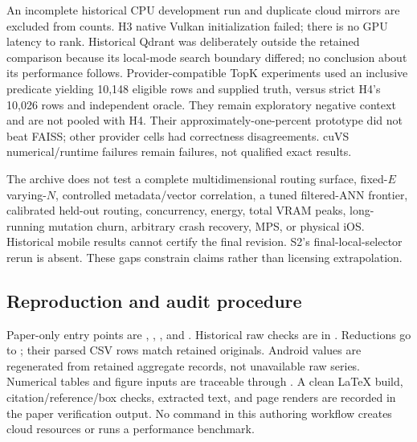 An incomplete historical CPU development run and duplicate cloud mirrors are excluded from counts. H3 native Vulkan initialization failed; there is no GPU latency to rank. Historical Qdrant was deliberately outside the retained comparison because its local-mode search boundary differed; no conclusion about its performance follows. Provider-compatible TopK experiments used an inclusive predicate yielding 10,148 eligible rows and supplied truth, versus strict H4's 10,026 rows and independent oracle. They remain exploratory negative context and are not pooled with H4. Their approximately-one-percent prototype did not beat FAISS; other provider cells had correctness disagreements. cuVS numerical/runtime failures remain failures, not qualified exact results.

The archive does not test a complete multidimensional routing surface, fixed-$E$ varying-$N$, controlled metadata/vector correlation, a tuned filtered-ANN frontier, calibrated held-out routing, concurrency, energy, total VRAM peaks, long-running mutation churn, arbitrary crash recovery, MPS, or physical iOS. Historical mobile results cannot certify the final revision. S2's final-local-selector rerun is absent. These gaps constrain claims rather than licensing extrapolation.

\subsection{Reproduction and audit procedure}
Paper-only entry points are , , , and . Historical raw checks are in . Reductions go to ; their parsed CSV rows match retained originals. Android values are regenerated from retained aggregate records, not unavailable raw series. Numerical tables and figure inputs are traceable through . A clean LaTeX build, citation/reference/box checks, extracted text, and page renders are recorded in the paper verification output. No command in this authoring workflow creates cloud resources or runs a performance benchmark.
